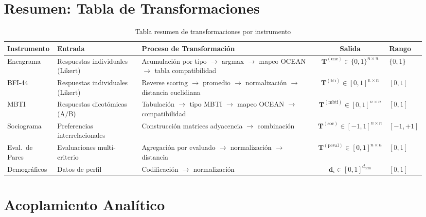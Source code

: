 \documentclass[12pt,a4paper]{article}
\begin{document}
\section{Resumen: Tabla de Transformaciones}
\label{sec:summary}

\begin{table}[h]
\centering
\small
\begin{tabular}{llp{3.5cm}cp{2.5cm}}
\toprule
\textbf{Instrumento} & \textbf{Entrada} & \textbf{Proceso de Transformación} & \textbf{Salida} & \textbf{Rango} \\
\midrule
Eneagrama & Respuestas individuales (Likert) & Acumulación por tipo $\to$ argmax $\to$ mapeo OCEAN $\to$ tabla compatibilidad & $\mathbf{T}^{(\text{ene})} \in \{0,1\}^{n \times n}$ & $\{0, 1\}$ \\
\midrule
BFI-44 & Respuestas individuales (Likert) & Reverse scoring $\to$ promedio $\to$ normalización $\to$ distancia euclidiana & $\mathbf{T}^{(\text{bfi})} \in [0,1]^{n \times n}$ & $[0, 1]$ \\
\midrule
MBTI & Respuestas dicotómicas (A/B) & Tabulación $\to$ tipo MBTI $\to$ mapeo OCEAN $\to$ compatibilidad & $\mathbf{T}^{(\text{mbti})} \in [0,1]^{n \times n}$ & $[0, 1]$ \\
\midrule
Sociograma & Preferencias interrelacionales & Construcción matrices adyacencia $\to$ combinación & $\mathbf{T}^{(\text{soc})} \in [-1,1]^{n \times n}$ & $[-1, +1]$ \\
\midrule
Eval.\ de Pares & Evaluaciones multi-criterio & Agregación por evaluado $\to$ normalización $\to$ distancia & $\mathbf{T}^{(\text{peval})} \in [0,1]^{n \times n}$ & $[0, 1]$ \\
\midrule
Demográficos & Datos de perfil & Codificación $\to$ normalización & $\mathbf{d}_i \in [0,1]^{d_{\text{dem}}}$ & $[0, 1]$ \\
\bottomrule
\end{tabular}
\caption{Tabla resumen de transformaciones por instrumento}
\end{table}

\section{Acoplamiento Analítico}
\label{sec:analytic}
\end{document}
